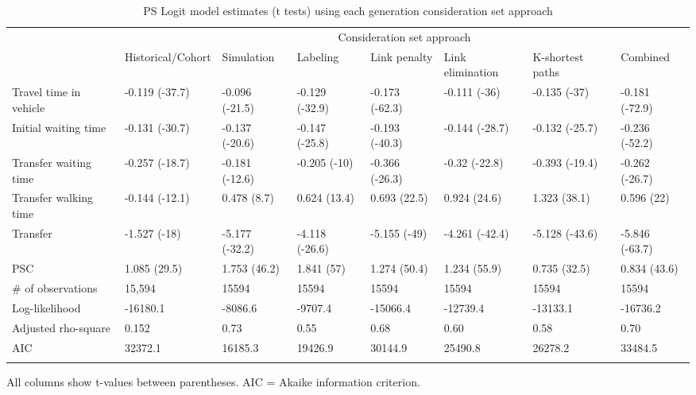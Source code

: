 \documentclass[12pt,a4paper]{article}
\begin{document}
\begin{landscape}
\begin{table}[]
\centering
\footnotesize\setlength\tabcolsep{3 pt}
\caption{PS Logit model estimates (t tests) using each generation consideration set approach}
\label{tab:pslmodel}  
\begin{tabular}{llllllll}
\hline\noalign{\smallskip}
\multicolumn{1}{c}{\multirow{2}{*}{Parameters}} & \multicolumn{7}{c}{Consideration set approach}                                                                              \\
\multicolumn{1}{c}{}                            & Historical/Cohort & Simulation     & Labeling       & Link penalty   & Link elimination & K-shortest paths & Combined       \\
\noalign{\smallskip}\hline\noalign{\smallskip}
Travel time in vehicle      & -0.119 (-37.7)    & -0.096 (-21.5) & -0.129 (-32.9)       & -0.173 (-62.3) & -0.111 (-36)     & -0.135 (-37)     & -0.181 (-72.9) \\
Initial waiting time        & -0.131 (-30.7)    & -0.137 (-20.6) & -0.147 (-25.8)       & -0.193 (-40.3) & -0.144 (-28.7)   & -0.132 (-25.7)   & -0.236 (-52.2) \\
Transfer waiting time       & -0.257 (-18.7)    & -0.181 (-12.6) & -0.205 (-10)         & -0.366 (-26.3) & -0.32 (-22.8)    & -0.393 (-19.4)   & -0.262 (-26.7) \\
Transfer walking time       & -0.144 (-12.1)    & 0.478 (8.7)    & 0.624 (13.4)         & 0.693 (22.5)   & 0.924 (24.6)     & 1.323 (38.1)     & 0.596 (22)     \\
Transfer                    & -1.527 (-18)      & -5.177 (-32.2) & -4.118 (-26.6)       & -5.155 (-49)   & -4.261 (-42.4)   & -5.128 (-43.6)   & -5.846 (-63.7) \\
PSC                         & 1.085 (29.5)      & 1.753 (46.2)   & 1.841 (57)           & 1.274 (50.4)   & 1.234 (55.9)     & 0.735 (32.5)     & 0.834 (43.6)   \\
\# of observations          & 15,594            & 15594          & 15594                & 15594          & 15594            & 15594            & 15594          \\
Log-likelihood              & -16180.1          & -8086.6        & -9707.4              & -15066.4       & -12739.4         & -13133.1         & -16736.2       \\
Adjusted rho-square         & 0.152             & 0.73           & 0.55                 & 0.68           & 0.60             & 0.58             & 0.70           \\
AIC                         & 32372.1           & 16185.3        & 19426.9              & 30144.9        & 25490.8          & 26278.2          & 33484.5    \\
\noalign{\smallskip}\hline
\end{tabular}
\vskip 0.05cm
\footnotesize{All columns show t-values between parentheses. AIC = Akaike information criterion.}
\end{table}


\end{landscape}
\end{document}
